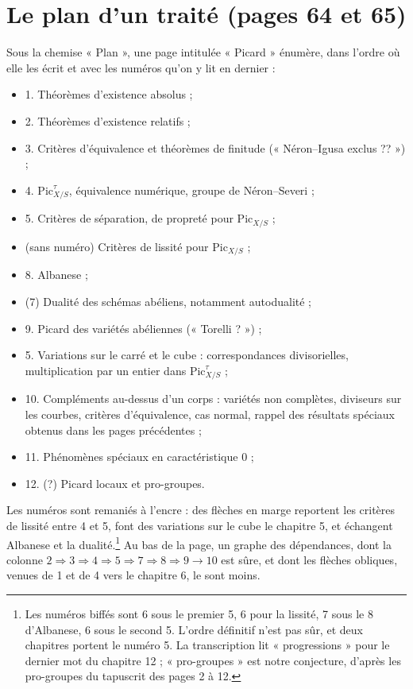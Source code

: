 \documentclass[11pt,a4paper]{article}
\begin{document}
\section*{Le plan d'un traité (pages 64 et 65)}

Sous la chemise « Plan », une page intitulée « Picard » énumère, dans l'ordre
où elle les écrit et avec les numéros qu'on y lit en dernier :
\begin{itemize}
  \item 1. Théorèmes d'existence absolus ;
  \item 2. Théorèmes d'existence relatifs ;
  \item 3. Critères d'équivalence et théorèmes de finitude (« Néron--Igusa
    exclus ?? ») ;
  \item 4. $\mathrm{Pic}^\tau_{X/S}$, équivalence numérique, groupe de
    Néron--Severi ;
  \item 5. Critères de séparation, de propreté pour $\mathrm{Pic}_{X/S}$ ;
  \item (sans numéro) Critères de lissité pour $\mathrm{Pic}_{X/S}$ ;
  \item 8. Albanese ;
  \item (7) Dualité des schémas abéliens, notamment autodualité ;
  \item 9. Picard des variétés abéliennes (« Torelli ? ») ;
  \item 5. Variations sur le carré et le cube : correspondances divisorielles,
    multiplication par un entier dans $\mathrm{Pic}^\tau_{X/S}$ ;
  \item 10. Compléments au-dessus d'un corps : variétés non complètes,
    diviseurs sur les courbes, critères d'équivalence, cas normal, rappel des
    résultats spéciaux obtenus dans les pages précédentes ;
  \item 11. Phénomènes spéciaux en caractéristique $0$ ;
  \item 12. (?) Picard locaux et pro-groupes.
\end{itemize}
Les numéros sont remaniés à l'encre : des flèches en marge reportent les
critères de lissité entre 4 et 5, font des variations sur le cube le
chapitre 5, et échangent Albanese et la dualité.\footnote{Les numéros biffés
sont 6 sous le premier 5, 6 pour la lissité, 7 sous le 8 d'Albanese, 6 sous le
second 5. L'ordre définitif n'est pas sûr, et deux chapitres portent le
numéro 5. La transcription lit « progressions » pour le dernier mot du
chapitre 12 ; « pro-groupes » est notre conjecture, d'après les pro-groupes du
tapuscrit des pages 2 à 12.} Au bas de la page, un graphe des dépendances,
dont la colonne $2 \Rightarrow 3 \Rightarrow 4 \Rightarrow 5 \Rightarrow 7
\Rightarrow 8 \Rightarrow 9 \to 10$ est sûre, et dont les flèches obliques,
venues de 1 et de 4 vers le chapitre 6, le sont moins.
\end{document}
